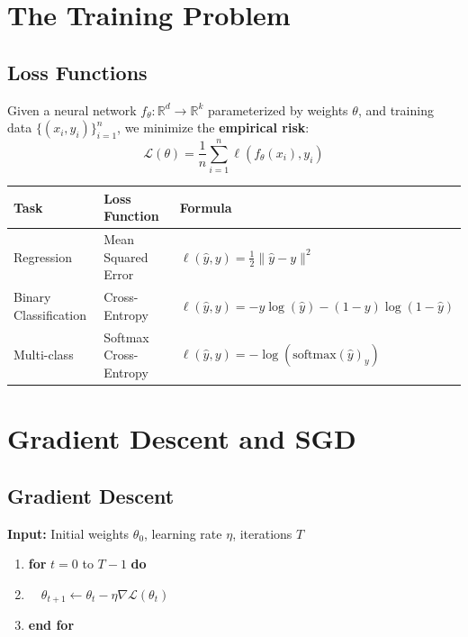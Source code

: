 \documentclass[main.tex]{subfiles}
\begin{document}
\needspace{0.33\textheight}
\section{The Training Problem}

\subsection{Loss Functions}

Given a neural network $f_\theta: \mathbb{R}^d \to \mathbb{R}^k$ parameterized by weights $\theta$, and training data $\{(x_i, y_i)\}_{i=1}^{n}$, we minimize the \textbf{empirical risk}:
$$\mathcal{L}(\theta) = \frac{1}{n} \sum_{i=1}^{n} \ell(f_\theta(x_i), y_i)$$

\begin{center}
\begin{tabular}{lll}
\hline
\textbf{Task} & \textbf{Loss Function} & \textbf{Formula} \\
\hline
Regression & Mean Squared Error & $\ell(\hat{y}, y) = \frac{1}{2}\|\hat{y} - y\|^2$ \\[4pt]
Binary Classification & Cross-Entropy & $\ell(\hat{y}, y) = -y\log(\hat{y}) - (1-y)\log(1-\hat{y})$ \\[4pt]
Multi-class & Softmax Cross-Entropy & $\ell(\hat{y}, y) = -\log(\text{softmax}(\hat{y})_y)$ \\
\hline
\end{tabular}
\end{center}

\needspace{0.33\textheight}
\section{Gradient Descent and SGD}

\subsection{Gradient Descent}

\begin{algorithm}
\textbf{Input:} Initial weights $\theta_0$, learning rate $\eta$, iterations $T$

\begin{enumerate}
    \item \textbf{for} $t = 0$ to $T-1$ \textbf{do}
    \item $\quad \theta_{t+1} \leftarrow \theta_t - \eta \nabla \mathcal{L}(\theta_t)$
    \item \textbf{end for}
\end{enumerate}
\end{algorithm}
\end{document}
